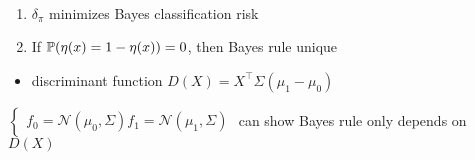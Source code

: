 \begin{prop}\,
    \begin{enumerate}
        \item $\delta_\pi$ minimizes Bayes classification risk
        \item If $\mathbb{P}(\eta(x) = 1 - \eta(x)) = 0$, then Bayes rule unique
    \end{enumerate}
\end{prop}

\begin{itemize}
    \item discriminant function $D(X) = X^\top\Sigma(\mu_1 - \mu_0)$
\end{itemize}

\begin{example}
    $\begin{cases}
         f_0 = \mathcal{N}(\mu_0, \Sigma)
         f_1 = \mathcal{N}(\mu_1, \Sigma)
    \end{cases}$
    can show Bayes rule only depends on $D(X)$
\end{example}

